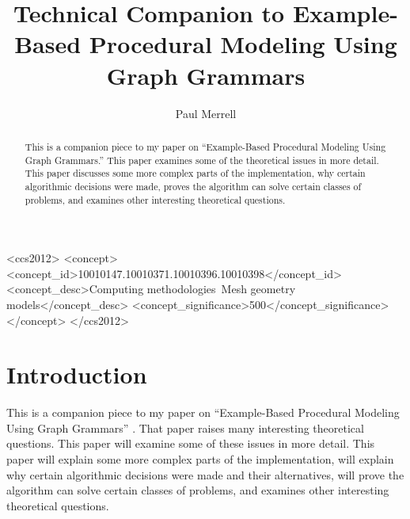 \documentclass[acmtog]{acmart}
\begin{document}
\title{Technical Companion to Example-Based Procedural Modeling Using Graph Grammars}

\newcommand{\bN}{{\wedge}}
\newcommand{\bV}{{\vee}}
\newcommand{\hN}{{\cap}}
\newcommand{\hV}{{\cup}}
\newcommand{\br}[1]{\overline{#1}}

\author{Paul Merrell}

\begin{abstract}

This is a companion piece to my paper on ``Example-Based Procedural Modeling 
Using Graph Grammars.'' This paper examines some of the theoretical issues in 
more detail. This paper discusses some more complex parts of the 
implementation, why certain algorithmic decisions were made, proves the 
algorithm can solve certain classes of problems, and examines other 
interesting theoretical questions.

\end{abstract}

\begin{CCSXML}
<ccs2012>
<concept>
<concept_id>10010147.10010371.10010396.10010398</concept_id>
<concept_desc>Computing methodologies~Mesh geometry models</concept_desc>
<concept_significance>500</concept_significance>
</concept>
</ccs2012>
\end{CCSXML}


\maketitle

\section{Introduction}

This is a companion piece to my paper on ``Example-Based Procedural Modeling 
Using Graph Grammars'' \cite{siggraph}. That paper raises many interesting theoretical 
questions. This paper will examine some of these issues in more detail. This 
paper will explain some more complex parts of the implementation, will 
explain why certain algorithmic decisions were made and their alternatives, 
will prove the algorithm can solve certain classes of problems, and examines 
other interesting theoretical questions.
\end{document}
